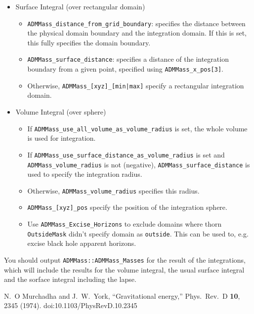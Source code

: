 \begin{itemize}
 \item Surface Integral (over rectangular domain)
  \begin{itemize}
   \item \texttt{ADMMass\_distance\_from\_grid\_boundary}: specifies the distance
         between the physical domain boundary and the integration domain. If
         this is set, this fully specifies the domain boundary.
   \item \texttt{ADMMass\_surface\_distance}: specifies a distance of the integration
         boundary from a given point, specified using \texttt{ADMMass\_x\_pos[3]}.
   \item Otherwise, \texttt{ADMMass\_[xyz]\_[min|max]} specify a rectangular
         integration domain.
  \end{itemize}
 \item Volume Integral (over sphere)
  \begin{itemize}
   \item If \texttt{ADMMass\_use\_all\_volume\_as\_volume\_radius} is set,
         the whole volume is used for integration.
   \item If \texttt{ADMMass\_use\_surface\_distance\_as\_volume\_radius} is set
         and \texttt{ADMMass\_volume\_radius} is not (negative),
         \texttt{ADMMass\_surface\_distance} is used to specify the integration
         radius.
   \item Otherwise, \texttt{ADMMass\_volume\_radius} specifies this radius.
   \item \texttt{ADMMass\_[xyz]\_pos} specify the position of the integration
         sphere.
   \item Use \texttt{ADMMass\_Excise\_Horizons} to exclude domains where
         thorn \texttt{OutsideMask} didn't specify domain as \texttt{outside}.
         This can be used to, e.g. excise black hole apparent horizons.
  \end{itemize}
\end{itemize}

You should output \texttt{ADMMass::ADMMass\_Masses} for the result of the
integrations, which will include the results for the volume integral, the
usual surface integral and the sorface integral including the lapse.

\begin{thebibliography}{1}
N.~O Murchadha and J.~W.~York,
  ``Gravitational energy,''
  Phys.\ Rev.\ D {\bf 10}, 2345 (1974).
  doi:10.1103/PhysRevD.10.2345
\end{thebibliography}

